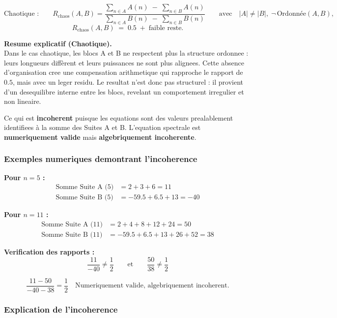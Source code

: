 \documentclass[a4paper,11pt]{article}
\begin{document}
\[
\text{Chaotique :}\qquad
R_{\mathrm{chaos}}(A,B)
=
\frac{\displaystyle \sum_{n \in A} A(n)\;-\;\sum_{n \in B} A(n)}
     {\displaystyle \sum_{n \in A} B(n)\;-\;\sum_{n \in B} B(n)}
\qquad\text{avec}\quad |A| \neq |B|,\; \neg\,\text{Ordonnée}(A,B),
\]
\[
R_{\mathrm{chaos}}(A,B) \;=\; 0.5 \;+\; \text{faible reste}.
\]

\textbf{Resume explicatif (Chaotique).} \\
Dans le cas chaotique, les blocs A et B ne respectent plus la structure ordonnee :
leurs longueurs diffèrent et leurs puissances ne sont plus alignees. Cette absence
d'organisation cree une compensation arithmetique qui rapproche le rapport de $0.5$,
mais avec un leger residu. Le resultat n'est donc pas structurel : il provient d'un
desequilibre interne entre les blocs, revelant un comportement irregulier et non lineaire.

\begin{tcolorbox}[colback=red!5,colframe=red!75,title={\textbf{Attention : Incoherence algebrique}}]
Ce qui est \textbf{incoherent} puisque les equations sont des valeurs prealablement identifiees à la somme des Suites A et B. L'equation spectrale est \textbf{numeriquement valide} mais \textbf{algebriquement incoherente}.
\end{tcolorbox}

\subsubsection{Exemples numeriques demontrant l'incoherence}

\textbf{Pour $n = 5$ :}
\begin{align}
\text{Somme Suite A (5)} &= 2 + 3 + 6 = 11 \\
\text{Somme Suite B (5)} &= -59.5 + 6.5 + 13 = -40
\end{align}

\textbf{Pour $n = 11$ :}
\begin{align}
\text{Somme Suite A (11)} &= 2 + 4 + 8 + 12 + 24 = 50 \\
\text{Somme Suite B (11)} &= -59.5 + 6.5 + 13 + 26 + 52 = 38
\end{align}

\textbf{Verification des rapports :}
\[
\frac{11}{-40} \neq \frac{1}{2}
\qquad\text{et}\qquad
\frac{50}{38} \neq \frac{1}{2}
\]

\[
\frac{11 - 50}{-40 - 38} = \frac{1}{2}
\quad\text{Numeriquement valide, algebriquement incoherent.}
\]

\subsubsection{Explication de l'incoherence}
\end{document}
